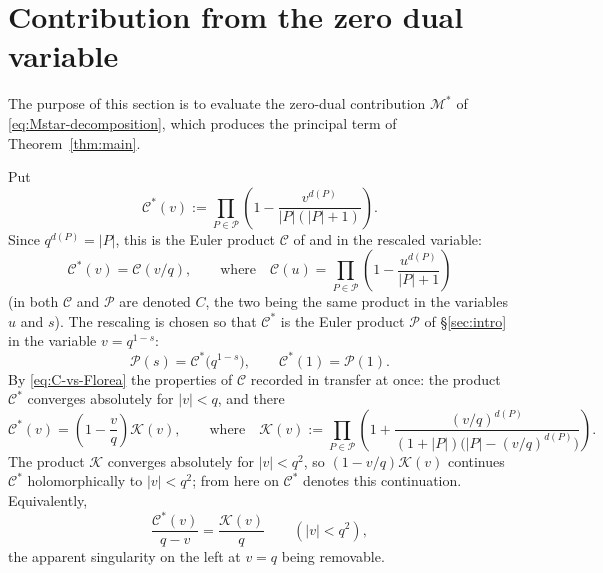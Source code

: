 \documentclass[a4paper,reqno]{amsart}
\numberwithin{equation}{section}
\theoremstyle{remark}
\theoremstyle{definition}
\begin{document}
\section{Contribution from the zero dual variable}\label{sec:main-term}

The purpose of this section is to evaluate the zero-dual contribution
$\mathcal M^*$ of \eqref{eq:Mstar-decomposition}, which produces the principal
term of Theorem~\ref{thm:main}.

Put
\begin{equation}\label{eq:C-def}
\mathcal C^*(v)
:=
\prod_{P\in\mathcal P}
\left(
1-\frac{v^{d(P)}}{|P|(|P|+1)}
\right).
\end{equation}
Since $q^{d(P)}=|P|$, this is the Euler product $\mathcal C$ of
\cite[(5.4)]{Fl17-1} and \cite[(4.2)]{AM-21} in the rescaled variable:
\begin{equation}\label{eq:C-vs-Florea}
\mathcal C^*(v)=\mathcal C(v/q),
\qquad\text{where}\quad
\mathcal C(u)=\prod_{P\in\mathcal P}\left(1-\frac{u^{d(P)}}{|P|+1}\right)
\end{equation}
(in \cite{Ju20} both $\mathcal C$ and $\mathscr P$ are denoted $C$, the two
being the same product in the variables $u$ and $s$). The rescaling
is chosen so that $\mathcal C^*$ is the Euler product $\mathscr P$ of
\S\ref{sec:intro} in the variable $v=q^{1-s}$:
\begin{equation}\label{eq:C-vs-P}
\mathscr P(s)=\mathcal C^*\bigl(q^{1-s}\bigr),
\qquad
\mathcal C^*(1)=\mathscr P(1).
\end{equation}
By \eqref{eq:C-vs-Florea} the properties of $\mathcal C$ recorded in
\cite[(5.4)--(5.5)]{Fl17-1} transfer at once: the product $\mathcal C^*$
converges absolutely for $|v|<q$, and there
\begin{equation}\label{eq:Cfact}
\mathcal C^*(v)=\left(1-\frac{v}{q}\right)\mathcal K(v),
\qquad\text{where}\quad
\mathcal K(v):=\prod_{P\in\mathcal P}
\left(1+\frac{(v/q)^{d(P)}}{(1+|P|)\bigl(|P|-(v/q)^{d(P)}\bigr)}\right).
\end{equation}
The product $\mathcal K$ converges absolutely for $|v|<q^2$, so
$(1-v/q)\mathcal K(v)$ continues $\mathcal C^*$ holomorphically to
$|v|<q^2$; from here on $\mathcal C^*$ denotes this continuation.
Equivalently,
\begin{equation}\label{eq:C-over-qv}
\frac{\mathcal C^*(v)}{q-v}=\frac{\mathcal K(v)}{q}
\qquad(|v|<q^2),
\end{equation}
the apparent singularity on the left at $v=q$ being removable.
\end{document}
